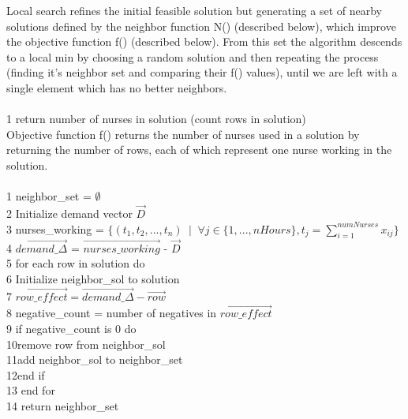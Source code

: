 \documentclass[11pt]{article}
\begin{document}
{Local search refines the initial feasible solution but generating a set of nearby solutions defined by the
neighbor function N() (described below), which improve the objective function f() (described below). From this set the algorithm descends to a local min by choosing a random
solution and then repeating the process (finding it's neighbor set and comparing their f() values), until we are left with a single element which has
no better neighbors.\\

\\
1 return number of nurses in solution (count rows in solution)\\

Objective function f() returns the number of nurses used in a solution by returning the number of rows, each of
which represent one nurse working in the solution.\\

\\
1  neighbor\_set = $\emptyset$\\
2  Initialize demand vector $\vec{D}$\\
3  nurses\_working = $\{(t_1,t_2,...,t_n) \phantom{a}|\phantom{a} \forall j \in \{1,...,nHours\}, t_j = \sum_{i=1}^{numNurses} x_{ij}\}$\\
4  $\vec{demand\_\Delta}$ = $\vec{nurses\_working}$ - $\vec{D}$\\
5  for each row in solution do\\
6\hspace*{.4cm} Initialize neighbor\_sol to solution\\
7\hspace*{.4cm} $\vec{row\_effect} = \vec{demand\_\Delta} - \vec{row}$\\
8\hspace*{.4cm} negative\_count = number of negatives in $\vec{row\_effect}$\\
9\hspace*{.4cm} if negative\_count is 0 do\\
10\hspace*{.8cm}remove row from neighbor\_sol\\
11\hspace*{.8cm}add neighbor\_sol to neighbor\_set\\
12\hspace*{.4cm}end if\\
13 end for\\
14 return neighbor\_set\\

}
\end{document}
